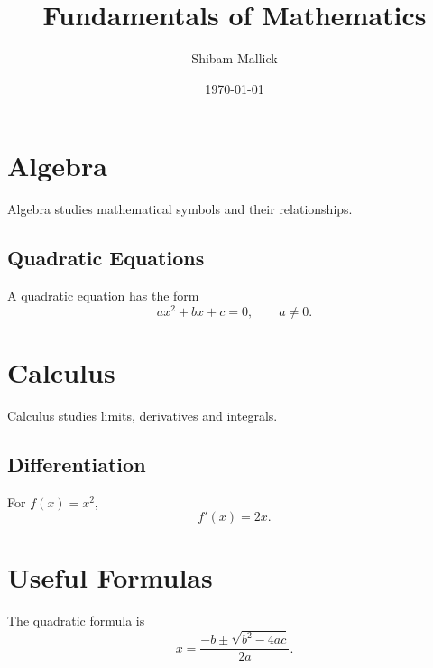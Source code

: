 \documentclass[12pt,a4paper,oneside]{book}
\title{Fundamentals of Mathematics}
\author{Shibam Mallick}
\date{\today}
\begin{document}
\frontmatter
\maketitle
\tableofcontents

\mainmatter

\chapter{Algebra}
Algebra studies mathematical
symbols and their relationships.

\section{Quadratic Equations}
A quadratic equation has the form
\[
ax^2+bx+c=0,\qquad a\ne0.
\]

\chapter{Calculus}
Calculus studies limits,
derivatives and integrals.

\section{Differentiation}
For \(f(x)=x^2\),
\[
f'(x)=2x.
\]

\appendix
\chapter{Useful Formulas}
The quadratic formula is
\[
x=\frac{-b\pm\sqrt{b^2-4ac}}{2a}.
\]
\end{document}
